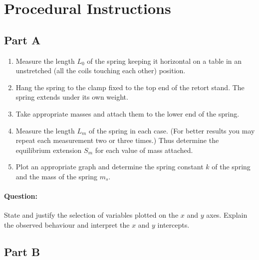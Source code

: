 \section*{Procedural Instructions}

\subsection*{Part A}
\begin{enumerate}
\item Measure the length $L_0$ of the spring keeping it horizontal on a table in an unstretched (all the coils touching each other) position.
\item Hang the spring to the clamp fixed to the top end of the retort stand. The spring extends under its own weight.
\item Take appropriate masses and attach them to the lower end of the spring. 
\item Measure the length $L_m$ of the spring in each case. (For better results you may repeat
each measurement two or three times.) Thus determine the equilibrium extension $S_m$ for each value of mass attached.
\item Plot an appropriate graph and determine the spring constant $k$ of the spring and the mass of the spring $m_s$.
\end{enumerate}

\begin{question}
\paragraph{Question:} State and justify the selection of variables plotted on the $x$ and $y$ axes. Explain the observed behaviour and interpret the $x$ and $y$ intercepts.
\end{question}


\subsection*{Part B}

